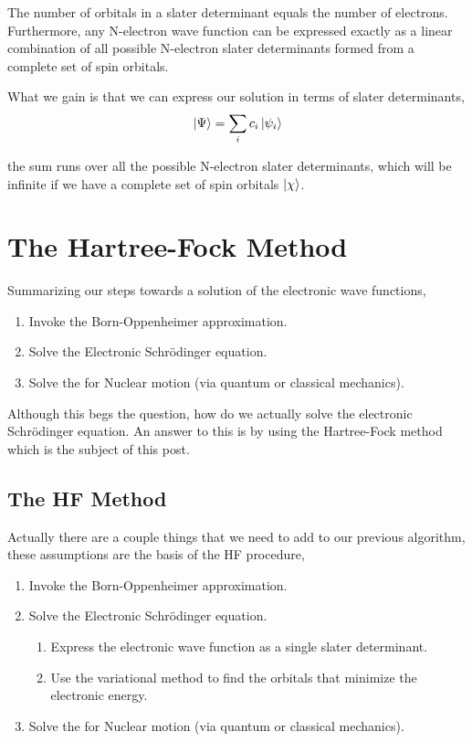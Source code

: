 \documentclass[a4paper]{article}
\begin{document}
The number of orbitals in a slater determinant equals the number of electrons.
Furthermore, any N-electron wave function can be expressed exactly as a linear combination of all possible N-electron slater determinants formed from a complete set of spin orbitals.

What we gain is that we can express our solution in terms of slater determinants,
$$ \ket{\Psi} = \sum_i c_i \ket{\psi_i} $$

the sum runs over all the possible N-electron slater determinants, which will be infinite if we have a complete set of spin orbitals $\ket{\chi}$.



\section{The Hartree-Fock Method}
Summarizing our steps towards a solution of the electronic wave functions,
\begin{enumerate}
\item Invoke the Born-Oppenheimer approximation.
\item Solve the Electronic Schr\"odinger equation.
\item Solve the for Nuclear motion (via quantum or classical mechanics).
\end{enumerate}

Although this begs the question, how do we actually solve the electronic Schr\"odinger equation.
An answer to this is by using the Hartree-Fock method which is the subject of this post.

\subsection{The HF Method}
Actually there are a couple things that we need to add to our previous algorithm, these assumptions are the basis of the HF procedure,
\begin{enumerate}
\item Invoke the Born-Oppenheimer approximation.
\item Solve the Electronic Schr\"odinger equation.
	\begin{enumerate}
	\item Express the electronic wave function as a single slater determinant.
	\item Use the variational method to find the orbitals that minimize the electronic energy.
	\end{enumerate}
\item Solve the for Nuclear motion (via quantum or classical mechanics).
\end{enumerate}
\end{document}
